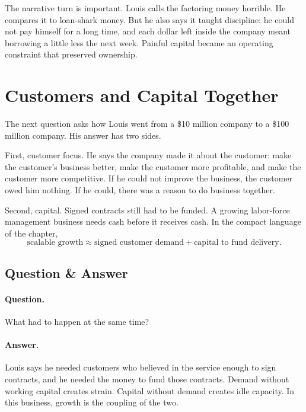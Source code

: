 The narrative turn is important. Louis calls the factoring money horrible. He compares it to loan-shark money. But he also says it taught discipline: he could not pay himself for a long time, and each dollar left inside the company meant borrowing a little less the next week. Painful capital became an operating constraint that preserved ownership.

\section{Customers and Capital Together}

The next question asks how Louis went from a \$10 million company to a \$100 million company. His answer has two sides.

First, customer focus. He says the company made it about the customer: make the customer's business better, make the customer more profitable, and make the customer more competitive. If he could not improve the business, the customer owed him nothing. If he could, there was a reason to do business together.

Second, capital. Signed contracts still had to be funded. A growing labor-force management business needs cash before it receives cash. In the compact language of the chapter,
\begin{equation}
\text{scalable growth}
\approx
\text{signed customer demand}
+
\text{capital to fund delivery}.
\end{equation}

\subsection{Question \& Answer}

\paragraph{Question.} What had to happen at the same time?

\paragraph{Answer.} Louis says he needed customers who believed in the service enough to sign contracts, and he needed the money to fund those contracts. Demand without working capital creates strain. Capital without demand creates idle capacity. In this business, growth is the coupling of the two.

